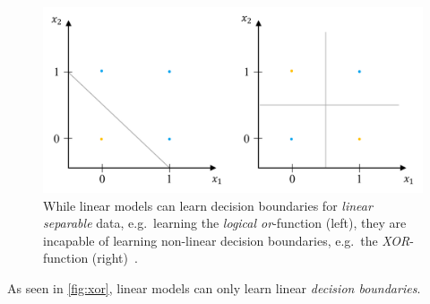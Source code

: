 \begin{figure}
    \centering
    \includegraphics[width=.9\linewidth]{images/xor}
    \caption[Limits of the linear model.]{While linear models can learn decision boundaries for \textit{linear separable} data, e.g.\ learning the \textit{logical or}-function (left), they are incapable of learning non-linear decision boundaries, e.g.\ the \textit{XOR}-function (right)~\autocite{sonnet2022NeuralBoook}.}
    \label{fig:xor}
\end{figure}

As seen in \autoref{fig:xor}, linear models can only learn linear \textit{decision boundaries}.








%
%
%
%
%
%
%
%
%

